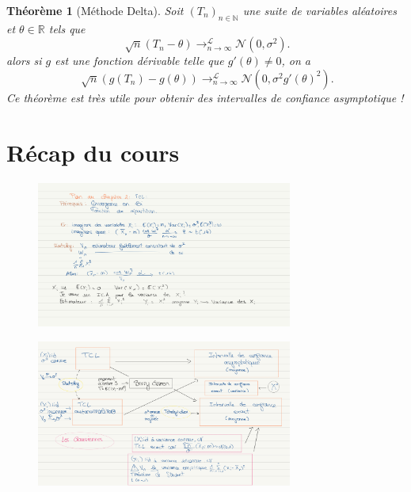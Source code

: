 \documentclass{article}
\theoremstyle{plain}%
\newtheorem{thm}{Théorème}[section]
\theoremstyle{definition}
\theoremstyle{remark}
\begin{document}
\begin{thm}[Méthode Delta]
    Soit $ (T_n)_{n \in \mathbb{N}} $ une suite de variables aléatoires et $ \theta \in \mathbb{R} $ tels que 
    \[
        \sqrt[]{n}(T_n - \theta ) \to ^{\mathcal{L}}_{n \to \infty } \mathcal{N}(0, \sigma ^2)
    .\]
    alors si $ g $ est une fonction dérivable telle que $ g'(\theta ) \neq 0 $, on a 
    \[
        \sqrt[]{n}(g(T_n) - g(\theta )) \to ^{\mathcal{L}}_{n \to \infty}  \mathcal{N}(0, \sigma ^2 g'(\theta)^2)
    .\]
    Ce théorème est très utile pour obtenir des intervalles de confiance asymptotique !
\end{thm}


\section{Récap du cours}
\begin{figure}[htbp]
    \centering
    \includegraphics*[width=0.75\textwidth]{./figures/Fiche recap BUTEZ P1.png}
\end{figure}

\begin{figure}[htbp]
    \centering
    \includegraphics*[width=0.75\textwidth]{./figures/Fiche recap BUTEZ P2.png}
\end{figure}
\end{document}
